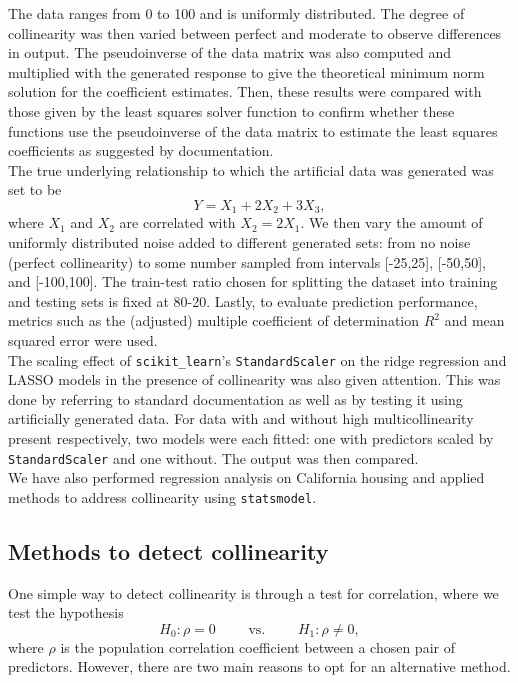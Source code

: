 \documentclass[12pt]{article}
\begin{document}
	The data ranges from 0 to 100 and is uniformly distributed. The degree of collinearity was then varied between perfect and moderate to observe differences in output. The pseudoinverse of the data matrix was also computed and multiplied with the generated response to give the theoretical minimum norm solution for the coefficient estimates. Then, these results were compared with those given by the least squares solver function to confirm whether these functions use the pseudoinverse of the data matrix to estimate the least squares coefficients as suggested by documentation.\\
	
	The true underlying relationship to which the artificial data was generated was set to be 
	\begin{equation}
		Y=X_1+2X_2+3X_3,
	\end{equation}
	where $X_1$ and $X_2$ are correlated with $X_2=2X_1$. We then vary the amount of uniformly distributed noise added to different generated sets: from no noise (perfect collinearity) to some number sampled from intervals [-25,25], [-50,50], and [-100,100]. The train-test ratio chosen for splitting the dataset into training and testing sets is fixed at 80-20. Lastly, to evaluate prediction performance, metrics such as the (adjusted) multiple coefficient of determination $R^2$ and mean squared error were used.\\
	
	The scaling effect of \texttt{scikit\_learn}'s \texttt{StandardScaler} on the ridge regression and LASSO models in the presence of collinearity was also given attention. This was done by referring to standard documentation as well as by testing it using artificially generated data. For data with and without high multicollinearity present respectively, two models were each fitted: one with predictors scaled by \texttt{StandardScaler} and one without. The output was then compared. \\
	
	We have also performed regression analysis on California housing and applied methods to address collinearity using \texttt{statsmodel}. 
	
	\subsection{Methods to detect collinearity\label{sec:3.1}}
	
	One simple way to detect collinearity is through a test for correlation, where we test the hypothesis
	$$H_0: \rho=0 \quad\quad\text{ vs. }\quad\quad H_1: \rho\neq 0,$$
	where $\rho$ is the population correlation coefficient between a chosen pair of predictors. However, there are two main reasons to opt for an alternative method.
	
\end{document}
